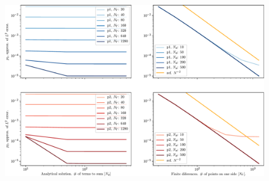 \documentclass[a4paper,10pt]{article}
\begin{document}
\begin{figure}
  \centering
  \includegraphics[width=\textwidth, keepaspectratio=true]{./continuous_convergency_crop.pdf}
  \caption{}
\end{figure}
\end{document}
